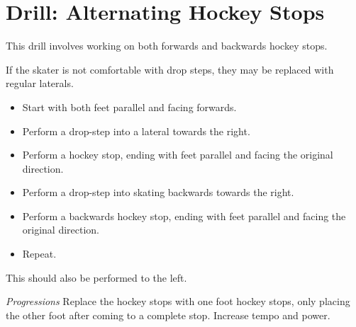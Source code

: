 \section{Drill: Alternating Hockey Stops}

This drill involves working on both forwards and backwards hockey stops.

If the skater is not comfortable with drop steps, they may be replaced with regular laterals.

\begin{itemize}
\item Start with both feet parallel and facing forwards.
\item Perform a drop-step into a lateral towards the right.
\item Perform a hockey stop, ending with feet parallel and facing the original direction.
\item Perform a drop-step into skating backwards towards the right.
\item Perform a backwards hockey stop, ending with feet parallel and facing the original direction. 
\item Repeat.
\end{itemize}

This should also be performed to the left.

{\it Progressions}
Replace the hockey stops with one foot hockey stops, only placing the other foot after coming to a complete stop.
Increase tempo and power.


